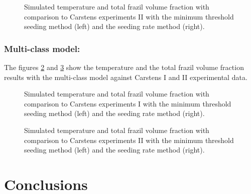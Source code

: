 \begin{figure}[H]
    \begin{center}
    \end{center}
    \caption{Simulated temperature and total frazil volume fraction with comparison to Carstens experiments II
             with the minimum threshold seeding method (left) and the seeding rate method (right).}
    \label{fig:carstens2_monoclass}
\end{figure}


\subsubsection{Multi-class model:}

The figures \ref{fig:carstens1_multiclass} and \ref{fig:carstens2_multiclass}
show the temperature and the total frazil volume fraction results with the multi-class 
model against Carstens I and II experimental data.

\begin{figure}[H]
    \begin{center}
    \end{center}
    \caption{Simulated temperature and total frazil volume fraction with comparison to Carstens experiments I
             with the minimum threshold seeding method (left) and the seeding rate method (right).}
    \label{fig:carstens1_multiclass}
\end{figure}
\begin{figure}[H]
    \begin{center}
    \end{center}
    \caption{Simulated temperature and total frazil volume fraction with comparison to Carstens experiments II
             with the minimum threshold seeding method (left) and the seeding rate method (right).}
    \label{fig:carstens2_multiclass}
\end{figure}

\section{Conclusions}


